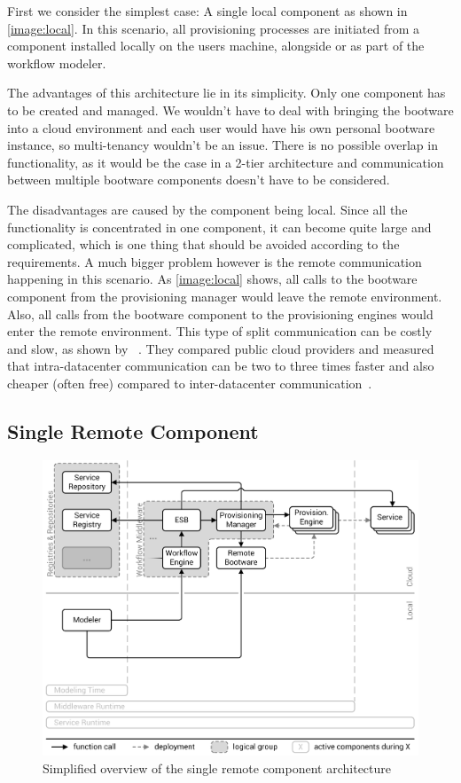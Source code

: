 First we consider the simplest case: A single local component as shown in \autoref{image:local}.
In this scenario, all provisioning processes are initiated from a component installed locally on the users machine, alongside or as part of the workflow modeler.

The advantages of this architecture lie in its simplicity.
Only one component has to be created and managed.
We wouldn't have to deal with bringing the bootware into a cloud environment and each user would have his own personal bootware instance, so multi-tenancy wouldn't be an issue.
There is no possible overlap in functionality, as it would be the case in a 2-tier architecture and communication between multiple bootware components doesn't have to be considered.

The disadvantages are caused by the component being local.
Since all the functionality is concentrated in one component, it can become quite large and complicated, which is one thing that should be avoided according to the requirements.
A much bigger problem however is the remote communication happening in this scenario.
As \autoref{image:local} shows, all calls to the bootware component from the provisioning manager would leave the remote environment.
Also, all calls from the bootware component to the provisioning engines would enter the remote environment.
This type of split communication can be costly and slow, as shown by \citeauthor*{cloudcmp}~\autocite{cloudcmp}.
They compared public cloud providers and measured that intra-datacenter communication can be two to three times faster and also cheaper (often free) compared to inter-datacenter communication~\autocite{cloudcmp}.

\subsection{Single Remote Component}

\begin{figure}[!htbp]
	\centering
	\includegraphics[resolution=600]{design/assets/remote}
	\caption{Simplified overview of the single remote component architecture}
	\label{image:remote}
\end{figure}

